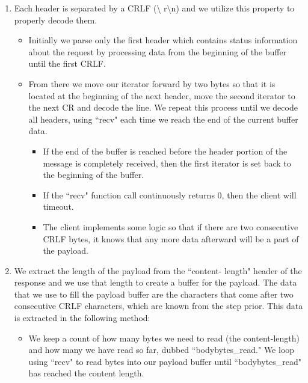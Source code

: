 \documentclass{article}
\begin{document}
        \begin{enumerate}
            \item Each header is separated by a CRLF (\textbackslash
                r\textbackslash n) and we utilize this property to properly
                decode them.
            \begin{itemize}
                \item Initially we parse only the first header which contains
                    status information about the request by processing data
                    from the beginning of the buffer until the first CRLF.
                \item From there we move our iterator forward by two bytes so
                    that it is located at the beginning of the next header,
                    move the second iterator to the next CR and decode the
                    line. We repeat this process until we decode all headers,
                    using ``recv" each time we reach the end of the current
                    buffer data.
                \begin{itemize}
                    \item If the end of the buffer is reached before the header
                        portion of the message is completely received, then the
                        first iterator is set back to the beginning of the
                        buffer.

                    \item If the ``recv" function call continuously returns 0,
                        then the client will timeout.
                    
                    \item The client implements some logic so that if there are
                        two consecutive CRLF bytes, it knows that any more data
                        afterward will be a part of the payload.
                \end{itemize}
            \end{itemize}

            \item We extract the length of the payload from the ``content-
                length" header of the response and we use that length to create
                a buffer for the payload. The data that we use to fill the
                payload buffer are the characters that come after two
                consecutive CRLF characters, which are known from the step
                prior. This data is extracted in the following method:
            \begin{itemize}
                \item We keep a count of how many bytes we need to read (the
                    content-length) and how many we have read so far, dubbed
                    ``bodybytes\_read."  We loop using ``recv" to read bytes
                    into our payload buffer until ``bodybytes\_read" has
                    reached the content length.
                

\end{itemize}
\end{enumerate}
\end{document}
